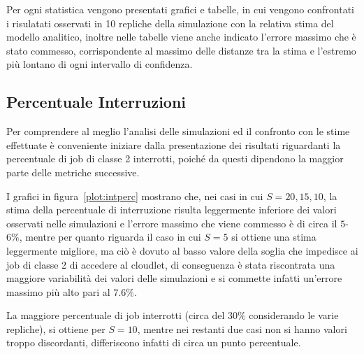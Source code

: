 Per ogni statistica vengono presentati grafici e tabelle, in cui vengono
confrontati i risulatati osservati in 10 repliche della simulazione con la
relativa stima del modello analitico, inoltre nelle tabelle viene anche indicato
l'errore massimo che è stato commesso, corrispondente al massimo delle distanze 
tra la stima e l'estremo più lontano di ogni intervallo di confidenza.
%
%
\subsection{Percentuale Interruzioni}
Per comprendere al meglio l'analisi delle simulazioni ed il confronto con le
stime effettuate è conveniente iniziare dalla presentazione dei risultati
riguardanti la percentuale di job di classe 2 interrotti, poiché da questi
dipendono la maggior parte delle metriche successive.

I grafici in figura~\ref{plot:intperc} mostrano che, nei casi in cui
$S=20,15,10$, la stima della percentuale di interruzione risulta leggermente
inferiore dei valori osservati nelle simulazioni e l'errore massimo che viene
commesso è di circa il $5$-$6\%$, mentre per quanto riguarda il caso in cui
$S=5$ si ottiene una stima leggermente migliore, ma ciò è dovuto al basso
valore della soglia che impedisce ai job di classe 2 di accedere al cloudlet, di
conseguenza è stata riscontrata una maggiore variabilità dei valori delle
simulazioni e si commette infatti un'errore massimo più alto pari al $7.6\%$.

La maggiore percentuale di job interrotti (circa del $30\%$ considerando le
varie repliche), si ottiene per $S=10$, mentre nei restanti due casi non si
hanno valori troppo discordanti, differiscono infatti di circa un punto
percentuale.

